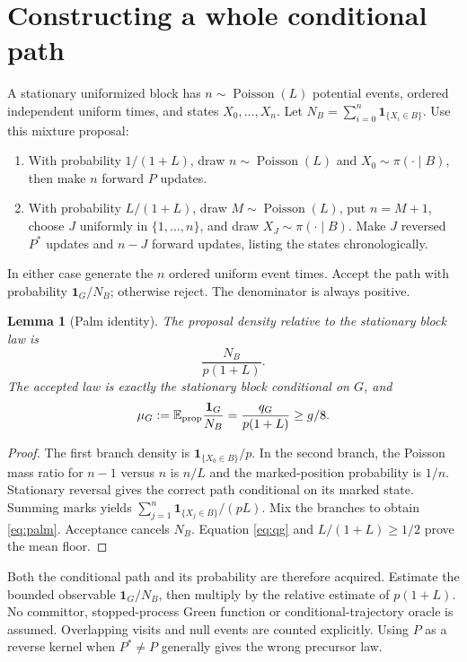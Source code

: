 \documentclass[10pt,a4paper]{article}
\newtheorem{lemma}{Lemma}
\newcommand{\E}{\mathbb E}
\newcommand{\one}{\mathbf 1}
\begin{document}
\section{Constructing a whole conditional path}
A stationary uniformized block has $n\sim\operatorname{Poisson}(L)$ potential events, ordered independent uniform times, and states $X_0,\ldots,X_n$. Let $N_B=\sum_{i=0}^n\one_{\{X_i\in B\}}$. Use this mixture proposal:
\begin{enumerate}
\item With probability $1/(1+L)$, draw $n\sim\operatorname{Poisson}(L)$ and $X_0\sim\pi(\cdot\mid B)$, then make $n$ forward $P$ updates.
\item With probability $L/(1+L)$, draw $M\sim\operatorname{Poisson}(L)$, put $n=M+1$, choose $J$ uniformly in $\{1,\ldots,n\}$, and draw $X_J\sim\pi(\cdot\mid B)$. Make $J$ reversed $P^*$ updates and $n-J$ forward updates, listing the states chronologically.
\end{enumerate}
In either case generate the $n$ ordered uniform event times. Accept the path with probability $\one_G/N_B$; otherwise reject. The denominator is always positive.

\begin{lemma}[Palm identity]\label{lem:palm}
The proposal density relative to the stationary block law is
\begin{equation}
\frac{N_B}{p(1+L)}. \label{eq:palm}
\end{equation}
The accepted law is exactly the stationary block conditional on $G$, and
\begin{equation}
\mu_G:=\E_{\rm prop}\frac{\one_G}{N_B}
=\frac{q_G}{p(1+L)}\ge g/8. \label{eq:accept}
\end{equation}
\end{lemma}
\begin{proof}
The first branch density is $\one_{\{X_0\in B\}}/p$. In the second branch, the Poisson mass ratio for $n-1$ versus $n$ is $n/L$ and the marked-position probability is $1/n$. Stationary reversal gives the correct path conditional on its marked state. Summing marks yields $\sum_{j=1}^n\one_{\{X_j\in B\}}/(pL)$. Mix the branches to obtain \eqref{eq:palm}. Acceptance cancels $N_B$. Equation \eqref{eq:qg} and $L/(1+L)\ge1/2$ prove the mean floor.
\end{proof}

Both the conditional path and its probability are therefore acquired. Estimate the bounded observable $\one_G/N_B$, then multiply by the relative estimate of $p(1+L)$. No committor, stopped-process Green function or conditional-trajectory oracle is assumed. Overlapping visits and null events are counted explicitly. Using $P$ as a reverse kernel when $P^*\ne P$ generally gives the wrong precursor law.




\end{document}
